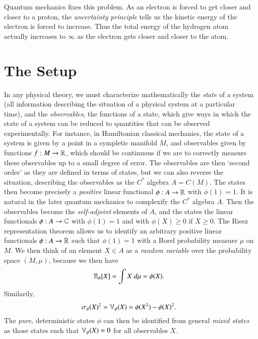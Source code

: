 Quantum mechanics fixes this problem. As an electron is forced to get closer and closer to a proton, the \emph{uncertainty principle} tells us the kinetic energy of the electron is forced to increase. Thus the total energy of the hydrogen atom actually increases to $\infty$ as the electron gets closer and closer to the atom.

\chapter{The Setup}

In any physical theory, we must characterize mathematically the \emph{state} of a system (all information describing the situation of a physical system at a particular time), and the \emph{observables}, the functions of a state, which give ways in which the state of a system can be reduced to quantities that can be observed experimentally. For instance, in Hamiltonian classical mechanics, the state of a system is given by a point in a sympletic manifold $M$, and observables given by functions $f: M \to \operatorname{\mathbb{R}}$, which should be continuous if we are to correctly measure these observables up to a small degree of error. The observables are then `second order' as they are defined in terms of states, but we can also reverse the situation, describing the observables as the $C^*$ algebra $A = C(M)$. The states then become precisely a \emph{positive} linear functional $\phi: A \to \operatorname{\mathbb{R}}$ with $\phi(1) = 1$. It is natural in the later quantum mechanics to complexify the $C^*$ algebra $A$. Then the observables become the \emph{self-adjoint} elements of $A$, and the states the linear functionals $\phi: A \to \operatorname{\mathbb{C}}$ with $\phi(1) = 1$ and with $\phi(X) \geq 0$ if $X \geq 0$. The Riesz representation theorem allows us to identify an arbitrary positive linear functionals $\phi: A \to \operatorname{\mathbb{R}}$ such that $\phi(1) = 1$ with a Borel probability measure $\mu$ on $M$. We then think of an element $X \in A$ as a \emph{random variable} over the probability space $(M,\mu)$, because we then have
%
\[ \operatorname{\mathbb{E}}_\phi[X] = \int X\; d\mu = \phi(X). \]
%
Similarily,
%
\[ \sigma_\phi(X)^2 = \operatorname{\mathbb{V}}_\phi(X) = \phi(X^2) - \phi(X)^2. \]
%
The \emph{pure}, deterministic states $\phi$ can then be identified from general \emph{mixed states} as those states such that $\operatorname{\mathbb{V}}_\phi(X) = 0$ for all observables $X$.



